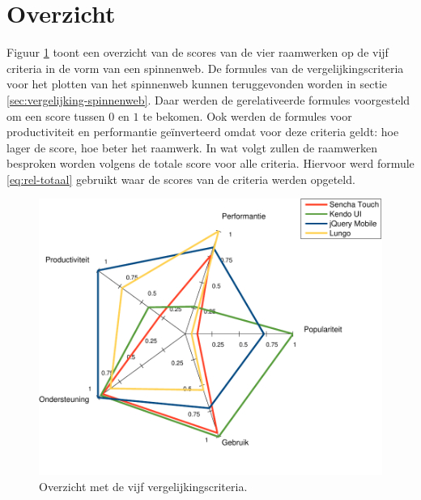 \section{Overzicht}
\label{sec:evaluatie-spinnenweb}

Figuur \ref{fig:spinnenweb-final} toont een overzicht van de scores van de vier raamwerken op de vijf criteria in de vorm van een spinnenweb.
De formules van de vergelijkingscriteria voor het plotten van het spinnenweb kunnen teruggevonden worden in sectie \ref{sec:vergelijking-spinnenweb}.
Daar werden de gerelativeerde formules voorgesteld om een score tussen $0$ en $1$ te bekomen.
Ook werden de formules voor productiviteit en performantie geïnverteerd omdat voor deze criteria geldt:  hoe lager de score, hoe beter het raamwerk.
In wat volgt zullen de raamwerken besproken worden volgens de totale score voor alle criteria.
Hiervoor werd formule \ref{eq:rel-totaal} gebruikt waar de scores van de criteria werden opgeteld.

\begin{figure}
  \centering
  \includegraphics[width=\textwidth]{figuren/spidergraph-final-nl.pdf}
  \caption{Overzicht met de vijf vergelijkingscriteria.}
  \label{fig:spinnenweb-final}
\end{figure}


